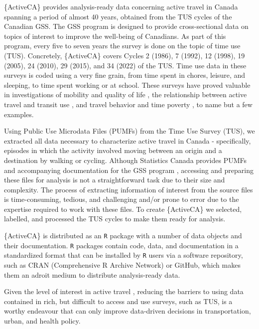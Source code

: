 \documentclass[Royal,times,sageh]{sagej}
\begin{document}
\{ActiveCA\} provides analysis-ready data concerning active travel in
Canada spanning a period of almost 40 years, obtained from the TUS
cycles of the Canadian GSS. The GSS program is designed to provide
cross-sectional data on topics of interest to improve the well-being of
Canadians. As part of this program, every five to seven years the survey
is done on the topic of time use (TUS). Concretely, \{ActiveCA\} covers
Cycles 2 (1986), 7 (1992), 12 (1998), 19 (2005), 24 (2010), 29 (2015),
and 34 (2022) of the TUS. Time use data in these surveys is coded using
a very fine grain, from time spent in chores, leisure, and sleeping, to
time spent working or at school. These surveys have proved valuable in
investigations of mobility and quality of life
\citep{spinneyTransport2009}, the relationship between active travel and
transit use \citep{lachapelleLonger2016}, and travel behavior and time
poverty \citep{kimFacing2024}, to name but a few examples.

Using Public Use Microdata Files (PUMFs) from the Time Use Survey (TUS),
we extracted all data necessary to characterize active travel in Canada
- specifically, episodes in which the activity involved moving between
an origin and a destination by walking or cycling. Although Statistics
Canada provides PUMFs and accompanying documentation for the GSS program
\citep[see][]{statisticscanada2024}, accessing and preparing these files
for analysis is not a straightforward task due to their size and
complexity. The process of extracting information of interest from the
source files is time-consuming, tedious, and challenging and/or prone to
error due to the expertise required to work with these files. To create
\{ActiveCA\} we selected, labelled, and processed the TUS cycles to make
them ready for analysis.

\{ActiveCA\} is distributed as an \texttt{R} package with a number of
data objects and their documentation. \texttt{R} packages contain code,
data, and documentation in a standardized format that can be installed
by \texttt{R} users via a software repository, such as CRAN
(Comprehensive R Archive Network) or GitHub, which makes them an adroit
medium to distribute analysis-ready data.

Given the level of interest in active travel
\citep[e.g.,][]{mccurdySupport2023}, reducing the barriers to using data
contained in rich, but difficult to access and use surveys, such as TUS,
is a worthy endeavour that can only improve data-driven decisions in
transportation, urban, and health policy.
\end{document}
